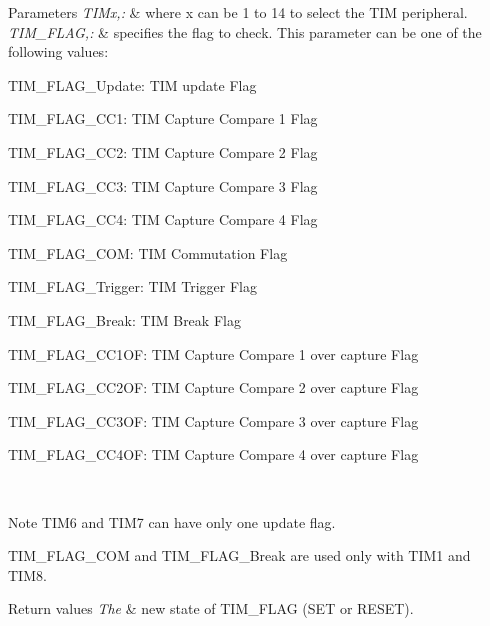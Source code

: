 \begin{DoxyParams}{Parameters}
{\em T\-I\-Mx,\-:} & where x can be 1 to 14 to select the T\-I\-M peripheral. \\
\hline
{\em T\-I\-M\-\_\-\-F\-L\-A\-G,\-:} & specifies the flag to check. This parameter can be one of the following values\-: \begin{DoxyItemize}
\item T\-I\-M\-\_\-\-F\-L\-A\-G\-\_\-\-Update\-: T\-I\-M update Flag \item T\-I\-M\-\_\-\-F\-L\-A\-G\-\_\-\-C\-C1\-: T\-I\-M Capture Compare 1 Flag \item T\-I\-M\-\_\-\-F\-L\-A\-G\-\_\-\-C\-C2\-: T\-I\-M Capture Compare 2 Flag \item T\-I\-M\-\_\-\-F\-L\-A\-G\-\_\-\-C\-C3\-: T\-I\-M Capture Compare 3 Flag \item T\-I\-M\-\_\-\-F\-L\-A\-G\-\_\-\-C\-C4\-: T\-I\-M Capture Compare 4 Flag \item T\-I\-M\-\_\-\-F\-L\-A\-G\-\_\-\-C\-O\-M\-: T\-I\-M Commutation Flag \item T\-I\-M\-\_\-\-F\-L\-A\-G\-\_\-\-Trigger\-: T\-I\-M Trigger Flag \item T\-I\-M\-\_\-\-F\-L\-A\-G\-\_\-\-Break\-: T\-I\-M Break Flag \item T\-I\-M\-\_\-\-F\-L\-A\-G\-\_\-\-C\-C1\-O\-F\-: T\-I\-M Capture Compare 1 over capture Flag \item T\-I\-M\-\_\-\-F\-L\-A\-G\-\_\-\-C\-C2\-O\-F\-: T\-I\-M Capture Compare 2 over capture Flag \item T\-I\-M\-\_\-\-F\-L\-A\-G\-\_\-\-C\-C3\-O\-F\-: T\-I\-M Capture Compare 3 over capture Flag \item T\-I\-M\-\_\-\-F\-L\-A\-G\-\_\-\-C\-C4\-O\-F\-: T\-I\-M Capture Compare 4 over capture Flag\end{DoxyItemize}
\\
\hline
\end{DoxyParams}
\begin{DoxyNote}{Note}
T\-I\-M6 and T\-I\-M7 can have only one update flag. 

T\-I\-M\-\_\-\-F\-L\-A\-G\-\_\-\-C\-O\-M and T\-I\-M\-\_\-\-F\-L\-A\-G\-\_\-\-Break are used only with T\-I\-M1 and T\-I\-M8.
\end{DoxyNote}

\begin{DoxyRetVals}{Return values}
{\em The} & new state of T\-I\-M\-\_\-\-F\-L\-A\-G (S\-E\-T or R\-E\-S\-E\-T). \\
\hline
\end{DoxyRetVals}


